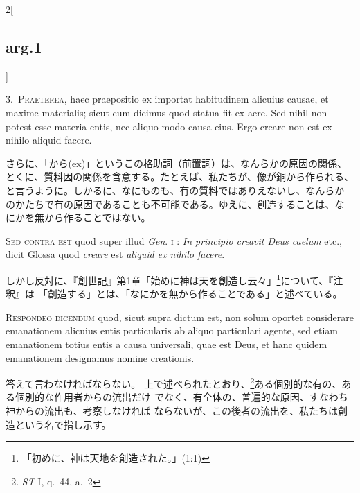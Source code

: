 \documentclass[paper=a4paper,fontsize=10pt,jafontsize=9pt,titlepage]{jlreq}
\begin{document}
\begin{paracol}{2}[\subsection{arg.1}]

3.~{\scshape Praeterea}, haec praepositio ex importat habitudinem alicuius causae, et
 maxime materialis; sicut cum dicimus quod statua fit ex aere.
Sed nihil
 non potest esse materia entis, nec aliquo modo causa eius. Ergo creare
 non est ex nihilo aliquid facere.

\switchcolumn

さらに、「から(ex)」というこの格助詞（前置詞）は、なんらかの原因の関係、
 とくに、質料因の関係を含意する。たとえば、私たちが、像が銅から作られる、
 と言うように。しかるに、なにものも、有の質料ではありえないし、なんらか
 のかたちで有の原因であることも不可能である。ゆえに、創造することは、な
 にかを無から作ることではない。

\switchcolumn*[\subsection{s.c.}]

{\scshape Sed contra est} quod super illud {\itshape Gen}. {\scshape i} : {\itshape In principio
 creavit Deus caelum} etc., dicit Glossa quod {\itshape creare} est {\itshape aliquid ex nihilo facere}.

\switchcolumn

しかし反対に、『創世記』第1章「始めに神は天を創造し云々」\footnote
{「初めに、神は天地を創造された。」(1:1)
}について、『注釈』は
 「創造する」とは、「なにかを無から作ることである」と述べている。


{\scshape Respondeo dicendum} quod, sicut supra dictum est, non solum oportet
 considerare emanationem alicuius entis particularis ab aliquo
 particulari agente, sed etiam emanationem totius entis a causa
 universali, quae est Deus, et hanc quidem emanationem designamus nomine
 creationis.

\switchcolumn

答えて言わなければならない。
上で述べられたとおり、\footnote{{\itshape ST} I, q.~44, a.~2}ある個別的な有の、ある個別的な作用者からの流出だけ
 でなく、有全体の、普遍的な原因、すなわち神からの流出も、考察しなければ
 ならないが、この後者の流出を、私たちは創造という名で指し示す。


\end{paracol}
\end{document}
